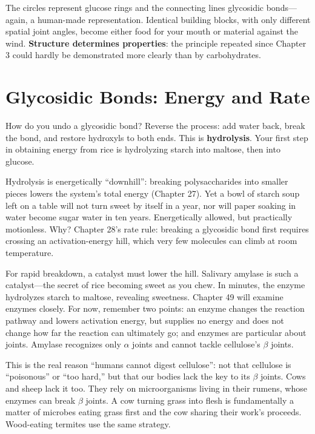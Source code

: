 The circles represent glucose rings and the connecting lines glycosidic bonds---again, a human-made representation. Identical building blocks, with only different spatial joint angles, become either food for your mouth or material against the wind. \textbf{Structure determines properties}: the principle repeated since Chapter 3 could hardly be demonstrated more clearly than by carbohydrates.

\section{Glycosidic Bonds: Energy and Rate}

How do you undo a glycosidic bond? Reverse the process: add water back, break the bond, and restore hydroxyls to both ends. This is \textbf{hydrolysis}. Your first step in obtaining energy from rice is hydrolyzing starch into maltose, then into glucose.

Hydrolysis is energetically ``downhill'': breaking polysaccharides into smaller pieces lowers the system's total energy (Chapter 27). Yet a bowl of starch soup left on a table will not turn sweet by itself in a year, nor will paper soaking in water become sugar water in ten years. Energetically allowed, but practically motionless. Why? Chapter 28's rate rule: breaking a glycosidic bond first requires crossing an activation-energy hill, which very few molecules can climb at room temperature.

For rapid breakdown, a catalyst must lower the hill. Salivary amylase is such a catalyst---the secret of rice becoming sweet as you chew. In minutes, the enzyme hydrolyzes starch to maltose, revealing sweetness. Chapter 49 will examine enzymes closely. For now, remember two points: an enzyme changes the reaction pathway and lowers activation energy, but supplies no energy and does not change how far the reaction can ultimately go; and enzymes are particular about joints. Amylase recognizes only $\alpha$ joints and cannot tackle cellulose's $\beta$ joints.

This is the real reason ``humans cannot digest cellulose'': not that cellulose is ``poisonous'' or ``too hard,'' but that our bodies lack the key to its $\beta$ joints. Cows and sheep lack it too. They rely on microorganisms living in their rumens, whose enzymes can break $\beta$ joints. A cow turning grass into flesh is fundamentally a matter of microbes eating grass first and the cow sharing their work's proceeds. Wood-eating termites use the same strategy.

